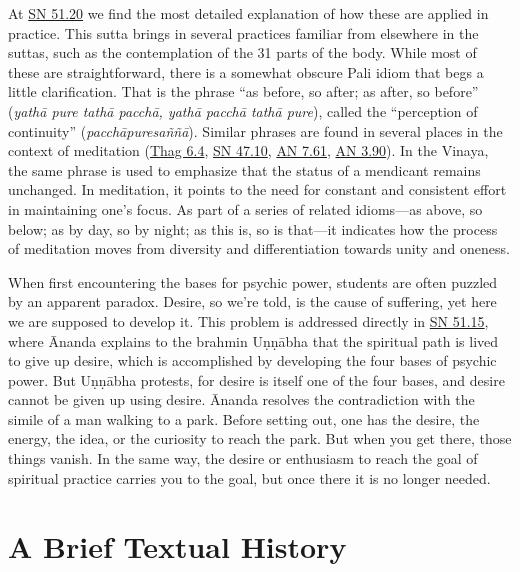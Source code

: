 \documentclass[12pt,openany]{book}%
\begin{document}
At \href{https://suttacentral.net/sn51.20}{SN 51.20} we find the most detailed explanation of how these are applied in practice. This sutta brings in several practices familiar from elsewhere in the suttas, such as the contemplation of the 31 parts of the body. While most of these are straightforward, there is a somewhat obscure Pali idiom that begs a little clarification. That is the phrase “as before, so after; as after, so before” (\textit{\textsanskrit{yathā} pure \textsanskrit{tathā} \textsanskrit{pacchā}, \textsanskrit{yathā} \textsanskrit{pacchā} \textsanskrit{tathā} pure}), called the “perception of continuity” (\textit{\textsanskrit{pacchāpuresaññā}}). Similar phrases are found in several places in the context of meditation (\href{https://suttacentral.net/thag6.4}{Thag 6.4}, \href{https://suttacentral.net/sn47.10}{SN 47.10}, \href{https://suttacentral.net/an7.61}{AN 7.61}, \href{https://suttacentral.net/an3.90}{AN 3.90}). In the Vinaya, the same phrase is used to emphasize that the status of a mendicant remains unchanged. In meditation, it points to the need for constant and consistent effort in maintaining one’s focus. As part of a series of related idioms—as above, so below; as by day, so by night; as this is, so is that—it indicates how the process of meditation moves from diversity and differentiation towards unity and oneness.

When first encountering the bases for psychic power, students are often puzzled by an apparent paradox. Desire, so we’re told, is the cause of suffering, yet here we are supposed to develop it. This problem is addressed directly in \href{https://suttacentral.net/sn51.15}{SN 51.15}, where Ānanda explains to the brahmin \textsanskrit{Uṇṇābha} that the spiritual path is lived to give up desire, which is accomplished by developing the four bases of psychic power. But \textsanskrit{Uṇṇābha} protests, for desire is itself one of the four bases, and desire cannot be given up using desire. Ānanda resolves the contradiction with the simile of a man walking to a park. Before setting out, one has the desire, the energy, the idea, or the curiosity to reach the park. But when you get there, those things vanish. In the same way, the desire or enthusiasm to reach the goal of spiritual practice carries you to the goal, but once there it is no longer needed.

\section*{A Brief Textual History}
\end{document}
